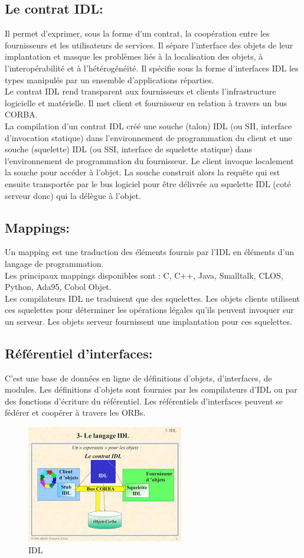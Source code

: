    \subsection{Le contrat IDL:}
   Il permet d'exprimer, sous la forme d'un contrat, la coopération entre les fournisseurs et les utilisateurs de services. Il sépare l'interface des objets de leur implantation et masque les problèmes liés à la localisation des objets, à l'interopérabilité et à l'hétérogénéité. Il spécifie sous la forme d'interfaces IDL les types manipulés par un ensemble d'applications réparties.\\
   Le contrat IDL rend transparent aux fournisseurs et clients l'infrastructure logicielle et matérielle. Il met client et fournisseur en relation à travers un bus CORBA.\\
   La compilation d'un contrat IDL créé une souche (talon) IDL (ou SII, interface d'invocation statique) dans l'environnement de programmation du client et une souche (squelette) IDL (ou SSI, interface de squelette statique) dans l'environnement de programmation du fournisseur.
   Le client invoque localement la souche pour accéder à l'objet. La souche construit alors la requête qui est ensuite transportée par le bus logiciel pour être délivrée au squelette IDL (coté serveur donc) qui la délègue à l'objet.\\

   \subsection{Mappings:}
   Un mapping est une traduction des éléments fournis par l'IDL en éléments d'un langage de programmation.\\
   Les principaux mappings disponibles sont : C, C++, Java, Smalltalk, CLOS, Python, Ada95, Cobol Objet.\\
   Les compilateurs IDL ne traduisent que des squelettes. Les objets clients utilisent ces squelettes pour déterminer les opérations légales qu'ils peuvent invoquer sur un serveur. Les objets serveur fournissent une implantation pour ces squelettes.

   \subsection{Référentiel d'interfaces:}
   C'est une base de données en ligne de définitions d'objets, d'interfaces, de modules. Les définitions d'objets sont fournies par les compilateurs d'IDL ou par des fonctions d'écriture du référentiel.
   Les référentiels d'interfaces peuvent se fédérer et coopérer à travers les ORBs.

   \vspace*{2cm}

   \begin{figure}[h]
         \centering
      \includegraphics[scale= 1]{IDL/3}
         \caption{IDL}
   \end{figure}
